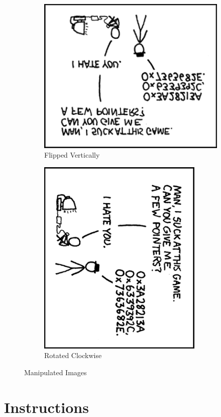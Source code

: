 \documentclass[12pt]{scrartcl}
\begin{document}
\begin{figure}
\begin{subfigure}{0.4\textwidth}
  \includegraphics[scale=.50]{hack7.0-files/pointersVFlip}
  \caption{Flipped Vertically}
  \label{image:pointersVFlip}
\end{subfigure}
\hspace*{1cm}
\begin{subfigure}{0.4\textwidth}
  \includegraphics[scale=.50]{hack7.0-files/pointersRotated}
  \caption{Rotated Clockwise}
  \label{image:pointersRotated}
\end{subfigure}
\caption{Manipulated Images}
\end{figure}

\section*{Instructions}
\end{document}
